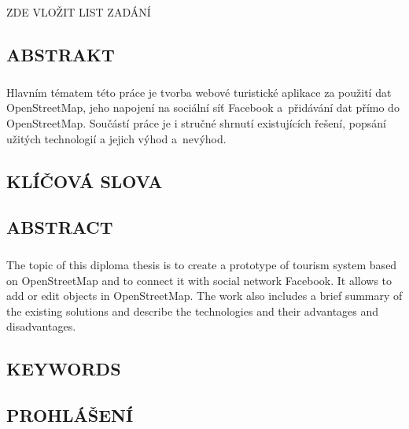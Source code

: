 \documentclass[11pt,a4paper,titlepage,oneside]{book}
\begin{document}
\newpage %
	\begin{center}
		\vspace*{15cm}
		{\Large ZDE VLOŽIT LIST ZADÁNÍ}
	\end{center}

\begin{flushleft}
	\chapter*{}
	\section*{ABSTRAKT}
	\paragraph{} Hlavním tématem této práce je tvorba webové turistické aplikace za použití dat OpenStreetMap, jeho napojení na sociální síť Facebook a~přidávání dat přímo do OpenStreetMap. Součástí práce je i stručné shrnutí existujících řešení, popsání užitých technologií a jejich výhod a~nevýhod.
	\section*{KLÍČOVÁ SLOVA}
	{}
	\section*{ABSTRACT}
	\paragraph{} The topic of this diploma thesis is to create a prototype of tourism system based on OpenStreetMap and to connect it with social network Facebook. It allows to add or edit objects in OpenStreetMap. The work also includes a brief summary of the existing solutions and describe the technologies and their advantages and disadvantages.
	\section*{KEYWORDS}
	{}
\end{flushleft}

\newpage %
	\vspace*{15cm}
	\section*{\Large PROHLÁŠENÍ}
\end{document}
